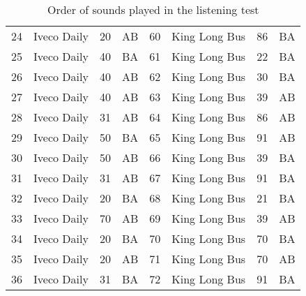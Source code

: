 \begin{table}
\begin{center}
\begin{tabular}{| c | l | c | c || c | l | c | c | }
 24 & Iveco Daily & 20 & AB & 60 & King Long Bus & 86 & BA\\
 25 & Iveco Daily & 40 & BA & 61 & King Long Bus & 22 & BA\\
 26 & Iveco Daily & 40 & AB & 62 & King Long Bus & 30 & BA\\
 27 & Iveco Daily & 40 & AB & 63 & King Long Bus & 39 & AB\\
 28 & Iveco Daily & 31 & AB & 64 & King Long Bus & 86 & AB\\
 29 & Iveco Daily & 50 & BA & 65 & King Long Bus & 91 & AB\\
 30 & Iveco Daily & 50 & AB & 66 & King Long Bus & 39 & BA\\
 31 & Iveco Daily & 31 & AB & 67 & King Long Bus & 91 & BA\\
 32 & Iveco Daily & 20 & BA & 68 & King Long Bus & 21 & BA\\
 33 & Iveco Daily & 70 & AB & 69 & King Long Bus & 39 & AB\\
 34 & Iveco Daily & 20 & BA & 70 & King Long Bus & 70 & BA\\
 35 & Iveco Daily & 20 & AB & 71 & King Long Bus & 70 & AB\\
 36 & Iveco Daily & 31 & BA & 72 & King Long Bus & 91 & BA\\
\hline
\end{tabular}
\caption{Order of sounds played in the listening test}
\label{tab:sound_order}
\end{center}
\end{table}



